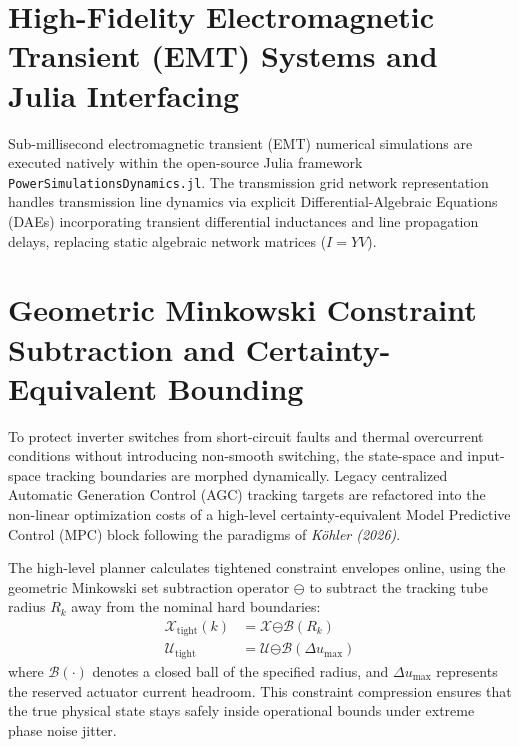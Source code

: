 \documentclass[11pt,fleqn]{article}
\begin{document}
\section{High-Fidelity Electromagnetic Transient (EMT) Systems and Julia Interfacing}
Sub-millisecond electromagnetic transient (EMT) numerical simulations are executed natively within the open-source Julia framework \texttt{PowerSimulationsDynamics.jl}. The transmission grid network representation handles transmission line dynamics via explicit Differential-Algebraic Equations (DAEs) incorporating transient differential inductances and line propagation delays, replacing static algebraic network matrices ($I = YV$).

\section{Geometric Minkowski Constraint Subtraction and Certainty-Equivalent Bounding}
To protect inverter switches from short-circuit faults and thermal overcurrent conditions without introducing non-smooth switching, the state-space and input-space tracking boundaries are morphed dynamically. Legacy centralized Automatic Generation Control (AGC) tracking targets are refactored into the non-linear optimization costs of a high-level certainty-equivalent Model Predictive Control (MPC) block following the paradigms of \textit{K\"ohler (2026)}. 

The high-level planner calculates tightened constraint envelopes online, using the geometric Minkowski set subtraction operator $\bm{\ominus}$ to subtract the tracking tube radius $R_k$ away from the nominal hard boundaries:
\begin{align}
    \mathcal{X}_{\text{tight}}(k) &= \mathcal{X} \bm{\ominus} \mathcal{B}(R_k) \\
    \mathcal{U}_{\text{tight}} &= \mathcal{U} \bm{\ominus} \mathcal{B}(\Delta u_{\max})
\end{align}
where $\mathcal{B}(\cdot)$ denotes a closed ball of the specified radius, and $\Delta u_{\max}$ represents the reserved actuator current headroom. This constraint compression ensures that the true physical state stays safely inside operational bounds under extreme phase noise jitter.
\end{document}
